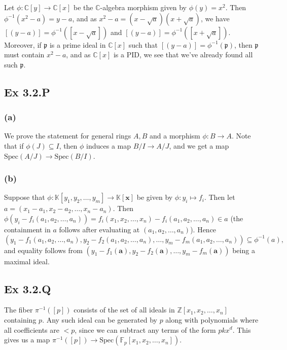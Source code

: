 \documentclass{article}
\theoremstyle{definition}
\newcommand{\Z}{\mathbb{Z}}
\newcommand{\C}{\mathbb{C}}
\newcommand{\K}{\mathbb{K}}
\newcommand{\F}{\mathbb{F}}
\newcommand{\Kx}{\K[\bm{x}]}
\newcommand{\Spec}{\text{Spec}}
\newcommand{\spec}{\Spec}
\begin{document}
Let $\phi : \C[y] \to \C[x]$ be the $\C$-algebra morphism given by $\phi(y) =
x^2$. Then $\phi^{-1}(x^2 - a) = y - a$, and as $x^2 - a = (x - \sqrt{a})(x +
\sqrt{a})$, we have $[(y - a)] = \phi^{-1}([x - \sqrt{a}])$ and $[(y - a)] =
\phi^{-1}([x + \sqrt{a}])$. Moreover, if $\mathfrak{p}$ is a prime ideal in
$\C[x]$ such that $[(y - a)] = \phi^{-1}(\mathfrak{p})$, then $\mathfrak{p}$
must contain $x^2 - a$, and as $\C[x]$ is a PID, we see that we've already
found all such $\mathfrak{p}$.

\subsection*{Ex 3.2.P}

\subsubsection*{(a)}

We prove the statement for general rings $A, B$ and a morphism $\phi : B \to
A$. Note that if $\phi(J) \subseteq I$, then $\phi$ induces a map $B/I \to
A/J$, and we get a map $\spec(A/J) \to \spec(B/I)$.

\subsubsection*{(b)}

Suppose that $\phi : \K[y_1, y_2, \ldots, y_m] \to \Kx$ be given by $\phi : y_i
\mapsto f_i$. Then let $a = (x_1 - a_1, x_2 - a_2, \ldots, x_n - a_n)$. Then
$\phi(y_i - f_i(a_1, a_2, \ldots, a_n)) = f_i(x_1, x_2, \ldots, x_n) - f_i(a_1,
a_2, \ldots, a_n) \in a$ (the containment in $a$ follows after evaluating at
$(a_1, a_2, \ldots, a_n)$). Hence 
\[
	(y_1 - f_1(a_1, a_2, \ldots, a_n), y_2 - f_2(a_1, a_2, \ldots, a_n), \ldots, y_m - f_m(a_1, a_2, \ldots, a_n))
	\subseteq 
	\phi^{-1}(a),
\] 
and equality follows from $(y_1 - f_1(\bm{a}), y_2 - f_2(\bm{a}), \ldots, y_m -
f_m(\bm{a}))$ being a maximal ideal.

\subsection*{Ex 3.2.Q}

The fiber $\pi^{-1}([p])$ consists of the set of all ideals in $\Z[x_1, x_2,
\ldots, x_n]$ containing $p$. Any such ideal can be generated by $p$ along with
polynomials where all coefficients are $< p$, since we can subtract any terms
of the form $pk x^d$. This gives us a map $\pi^{-1}([p]) \to \spec(\F_p[x_1,
x_2, \ldots, x_n])$. \\
\end{document}
